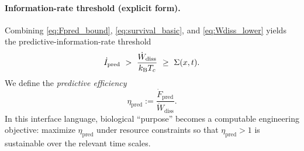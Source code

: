 \paragraph{Information-rate threshold (explicit form).}
Combining \eqref{eq:Fpred_bound}, \eqref{eq:survival_basic}, and \eqref{eq:Wdiss_lower} yields the predictive-information-rate threshold
\begin{equation}
  \dot I_{\mathrm{pred}}\ >\ \frac{\dot W_{\mathrm{diss}}}{k_{\mathrm{B}} T_c}
  \ \ge\ \Sigma(x,t).
  \label{eq:Idot_threshold}
\end{equation}
We define the \emph{predictive efficiency}
\begin{equation}
  \eta_{\mathrm{pred}} := \frac{\dot F_{\mathrm{pred}}}{\dot W_{\mathrm{diss}}}.
  \label{eq:eta_pred}
\end{equation}
In this interface language, biological ``purpose'' becomes a computable engineering objective: maximize $\eta_{\mathrm{pred}}$ under resource constraints so that $\eta_{\mathrm{pred}}>1$ is sustainable over the relevant time scales.


